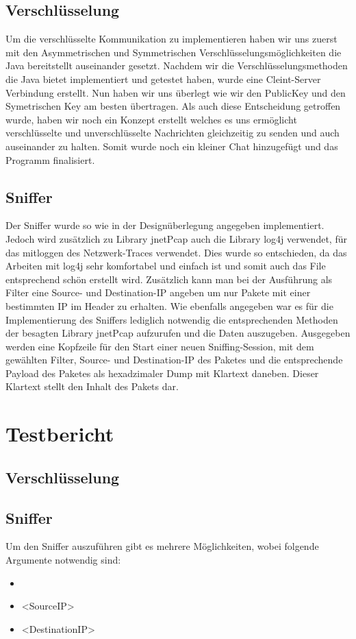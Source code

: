 \documentclass[a4paper,12pt]{scrreprt}
\begin{document}
\section{Verschlüsselung}
Um die verschlüsselte Kommunikation zu implementieren haben wir uns zuerst mit den Asymmetrischen und Symmetrischen Verschlüsselungsmöglichkeiten die Java bereitstellt auseinander gesetzt.
Nachdem wir die Verschlüsselungsmethoden die Java bietet implementiert und getestet haben, wurde eine Cleint-Server Verbindung erstellt. Nun haben wir uns überlegt wie wir den PublicKey und den Symetrischen Key am besten übertragen. 
Als auch diese Entscheidung getroffen wurde, haben wir noch ein Konzept erstellt welches es uns ermöglicht verschlüsselte und unverschlüsselte Nachrichten gleichzeitig zu senden und auch auseinander zu halten.
Somit wurde noch ein kleiner Chat hinzugefügt und das Programm finalisiert.
\section{Sniffer}
	Der Sniffer wurde so wie in der Designüberlegung angegeben implementiert. Jedoch wird zusätzlich zu Library jnetPcap auch die Library log4j verwendet, für das mitloggen des Netzwerk-Traces verwendet. Dies wurde so entschieden, da das Arbeiten mit log4j sehr komfortabel und einfach ist und somit auch das File entsprechend schön erstellt wird. Zusätzlich kann man bei der Ausführung als Filter eine Source- und Destination-IP angeben um nur Pakete mit einer bestimmten IP im Header zu erhalten. Wie ebenfalls angegeben war es für die Implementierung des Sniffers lediglich notwendig die entsprechenden Methoden der besagten Library jnetPcap aufzurufen und die Daten auszugeben. Ausgegeben werden eine Kopfzeile für den Start einer neuen Sniffing-Session, mit dem gewählten Filter, Source- und Destination-IP des Paketes und die entsprechende Payload des Paketes als hexadzimaler Dump mit Klartext daneben. Dieser Klartext stellt den Inhalt des Pakets dar. 
	
\chapter{Testbericht}
\section{Verschlüsselung}

\section{Sniffer}
	Um den Sniffer auszuführen gibt es mehrere Möglichkeiten, wobei folgende Argumente notwendig sind:
	\begin{itemize}
	\item <s|d|sd>
	\item <SourceIP>
	\item <DestinationIP>
	\end{itemize} 
	
\end{document}
